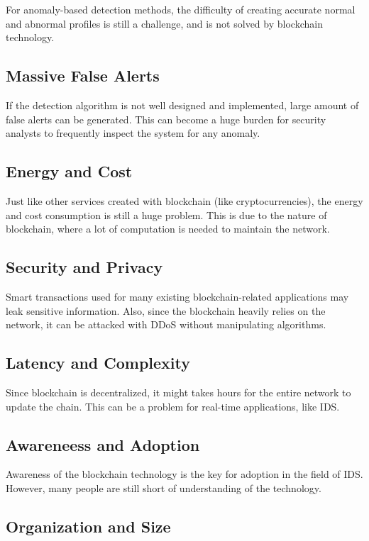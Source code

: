 \documentclass[12pt]{report}
\begin{document}
For anomaly-based detection methods, the difficulty of creating accurate normal and abnormal profiles is still a challenge, and is not solved by blockchain technology.

\subsection{Massive False Alerts}

If the detection algorithm is not well designed and implemented, large amount of false alerts can be generated. This can become a huge burden for security analysts to frequently inspect the system for any anomaly.

\subsection{Energy and Cost}

Just like other services created with blockchain (like cryptocurrencies), the energy and cost consumption is still a huge problem. This is due to the nature of blockchain, where a lot of computation is needed to maintain the network.

\subsection{Security and Privacy}

Smart transactions used for many existing blockchain-related applications may leak sensitive information. Also, since the blockchain heavily relies on the network, it can be attacked with DDoS without manipulating algorithms.

\subsection{Latency and Complexity}

Since blockchain is decentralized, it might takes hours for the entire network to update the chain. This can be a problem for real-time applications, like IDS.

\subsection{Awareneess and Adoption}

Awareness of the blockchain technology is the key for adoption in the field of IDS. However, many people are still short of understanding of the technology.

\subsection{Organization and Size}
\end{document}
